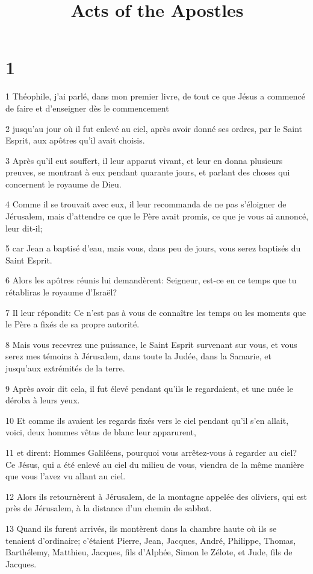 

\title{Acts of the Apostles}


\chapter{1}

\par 1 Théophile, j'ai parlé, dans mon premier livre, de tout ce que Jésus a commencé de faire et d'enseigner dès le commencement
\par 2 jusqu'au jour où il fut enlevé au ciel, après avoir donné ses ordres, par le Saint Esprit, aux apôtres qu'il avait choisis.
\par 3 Après qu'il eut souffert, il leur apparut vivant, et leur en donna plusieurs preuves, se montrant à eux pendant quarante jours, et parlant des choses qui concernent le royaume de Dieu.
\par 4 Comme il se trouvait avec eux, il leur recommanda de ne pas s'éloigner de Jérusalem, mais d'attendre ce que le Père avait promis, ce que je vous ai annoncé, leur dit-il;
\par 5 car Jean a baptisé d'eau, mais vous, dans peu de jours, vous serez baptisés du Saint Esprit.
\par 6 Alors les apôtres réunis lui demandèrent: Seigneur, est-ce en ce temps que tu rétabliras le royaume d'Israël?
\par 7 Il leur répondit: Ce n'est pas à vous de connaître les temps ou les moments que le Père a fixés de sa propre autorité.
\par 8 Mais vous recevrez une puissance, le Saint Esprit survenant sur vous, et vous serez mes témoins à Jérusalem, dans toute la Judée, dans la Samarie, et jusqu'aux extrémités de la terre.
\par 9 Après avoir dit cela, il fut élevé pendant qu'ils le regardaient, et une nuée le déroba à leurs yeux.
\par 10 Et comme ils avaient les regards fixés vers le ciel pendant qu'il s'en allait, voici, deux hommes vêtus de blanc leur apparurent,
\par 11 et dirent: Hommes Galiléens, pourquoi vous arrêtez-vous à regarder au ciel? Ce Jésus, qui a été enlevé au ciel du milieu de vous, viendra de la même manière que vous l'avez vu allant au ciel.
\par 12 Alors ils retournèrent à Jérusalem, de la montagne appelée des oliviers, qui est près de Jérusalem, à la distance d'un chemin de sabbat.
\par 13 Quand ils furent arrivés, ils montèrent dans la chambre haute où ils se tenaient d'ordinaire; c'étaient Pierre, Jean, Jacques, André, Philippe, Thomas, Barthélemy, Matthieu, Jacques, fils d'Alphée, Simon le Zélote, et Jude, fils de Jacques.

